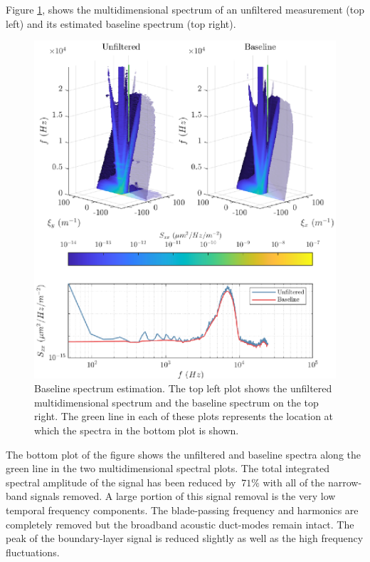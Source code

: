 Figure \ref{fig:06_filter_baseline}, shows the multidimensional spectrum of an unfiltered measurement (top left) and its estimated baseline spectrum (top right).
\begin{figure}
  \centering
  \includegraphics{../matlab/06_single_sensor_filtering/filter_baseline.eps}
  \caption{Baseline spectrum estimation. The top left plot shows the unfiltered multidimensional spectrum and the baseline spectrum on the top right. The green line in each of these plots represents the location at which the spectra in the bottom plot is shown.}
  \label{fig:06_filter_baseline}
\end{figure}
The bottom plot of the figure shows the unfiltered and baseline spectra along the green line in the two multidimensional spectral plots.
The total integrated spectral amplitude of the signal has been reduced by $~71\%$ with all of the narrow-band signals removed.
A large portion of this signal removal is the very low temporal frequency components.
The blade-passing frequency and harmonics are completely removed but the broadband acoustic duct-modes remain intact.
The peak of the boundary-layer signal is reduced slightly as well as the high frequency fluctuations.

